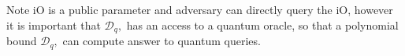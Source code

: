 %
%
%
%
\noindent Note iO is a public parameter and  adversary can directly query the iO, however it is important that $\mathcal{D}_q,$ has an access to a quantum oracle, so that a polynomial bound $\mathcal{D}_q,$ can compute answer to quantum queries.

